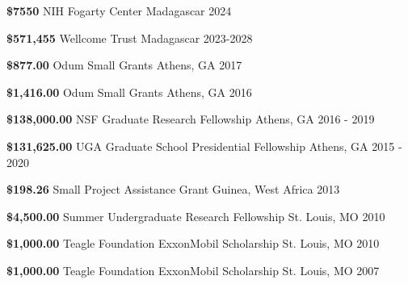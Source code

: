 \begin{cvhonors}



    \cvhonor
      {\textbf{\$7550}} %
      {NIH Fogarty Center} %
      {Madagascar} %
      {2024} %


    \cvhonor
      {\textbf{\$571,455}} %
      {Wellcome Trust} %
      {Madagascar} %
      {2023-2028} %


    \cvhonor
      {\textbf{\$877.00}} %
      {Odum Small Grants } %
      {Athens, GA} %
      {2017} %

  \cvhonor
    {\textbf{\$1,416.00}} %
    {Odum Small Grants } %
    {Athens, GA} %
    {2016} %

  \cvhonor
    {\textbf{\$138,000.00}} %
    {NSF Graduate Research Fellowship} %
    {Athens, GA} %
    {2016 - 2019} %

  \cvhonor
    {\textbf{\$131,625.00}} %
    {UGA Graduate School Presidential Fellowship} %
    {Athens, GA} %
    {2015 - 2020} %

  \cvhonor
    {\textbf{\$198.26}} %
    {Small Project Assistance Grant} %
    {Guinea, West Africa} %
    {2013} %

  \cvhonor
    {\textbf{\$4,500.00}} %
    {Summer Undergraduate Research Fellowship} %
    {St. Louis, MO} %
    {2010} %

  \cvhonor
    {\textbf{\$1,000.00}} %
    {Teagle Foundation ExxonMobil Scholarship} %
    {St. Louis, MO} %
    {2010} %

  \cvhonor
    {\textbf{\$1,000.00}} %
    {Teagle Foundation ExxonMobil Scholarship} %
    {St. Louis, MO} %
    {2007} %

\end{cvhonors}
